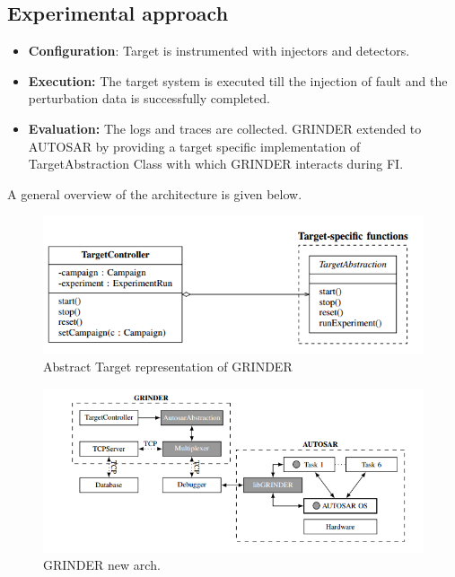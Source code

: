 
\subsection*{Experimental approach} %
\begin{itemize}
	\item \textbf{Configuration}: Target is instrumented with injectors and detectors.
	\item \textbf{Execution:} The target system is executed till the injection of fault and the perturbation data is successfully completed.
	\item \textbf{Evaluation:} The logs and traces are collected.
	GRINDER extended to AUTOSAR by providing a target specific implementation of TargetAbstraction Class with which GRINDER interacts during FI.
\end{itemize}
A general overview of the architecture is given below.
\begin{figure}
\begin{center}
	\centering
	\includegraphics[width=400pt]{Pictures/Grinder_Extension}
	\caption{Abstract Target representation of GRINDER}
\end{center}
\end{figure}

\begin{figure}[H]
	\centering
	\includegraphics[width=400pt]{Pictures/GRINDER_Arch}
	\caption{GRINDER new arch.}\label{visina8}
\end{figure}

